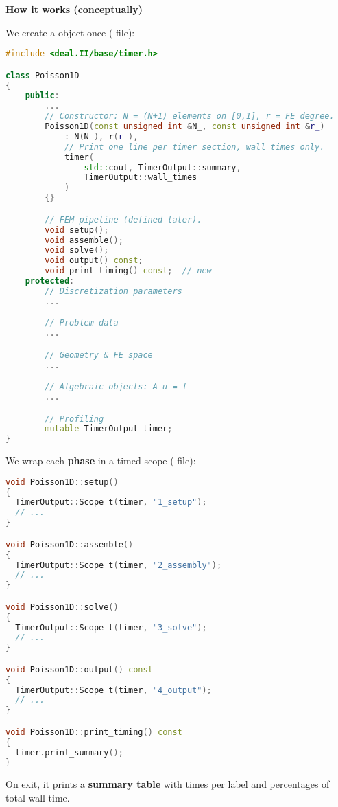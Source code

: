 \begin{flushleft}
    \textcolor{Green3}{ \textbf{How it works (conceptually)}}
\end{flushleft}
We create a  object once ( file):
\begin{lstlisting}[language=C++]
#include <deal.II/base/timer.h>

class Poisson1D
{
    public:
        ...
        // Constructor: N = (N+1) elements on [0,1], r = FE degree.
        Poisson1D(const unsigned int &N_, const unsigned int &r_)
            : N(N_), r(r_),
            // Print one line per timer section, wall times only.
            timer(
                std::cout, TimerOutput::summary,
                TimerOutput::wall_times
            )
        {}

        // FEM pipeline (defined later).
        void setup();
        void assemble();
        void solve();
        void output() const;
        void print_timing() const;  // new
    protected:
        // Discretization parameters
        ...

        // Problem data
        ...

        // Geometry & FE space
        ...

        // Algebraic objects: A u = f
        ...

        // Profiling
        mutable TimerOutput timer;
}\end{lstlisting}
We wrap each \textbf{phase} in a timed scope ( file):
\begin{lstlisting}[language=C++]
void Poisson1D::setup()
{
  TimerOutput::Scope t(timer, "1_setup");
  // ...
}

void Poisson1D::assemble()
{
  TimerOutput::Scope t(timer, "2_assembly");
  // ...
}

void Poisson1D::solve()
{
  TimerOutput::Scope t(timer, "3_solve");
  // ...
}

void Poisson1D::output() const
{
  TimerOutput::Scope t(timer, "4_output");
  // ...
}

void Poisson1D::print_timing() const
{
  timer.print_summary();
}\end{lstlisting}
On exit, it prints a \textbf{summary table} with times per label and percentages of total wall-time.